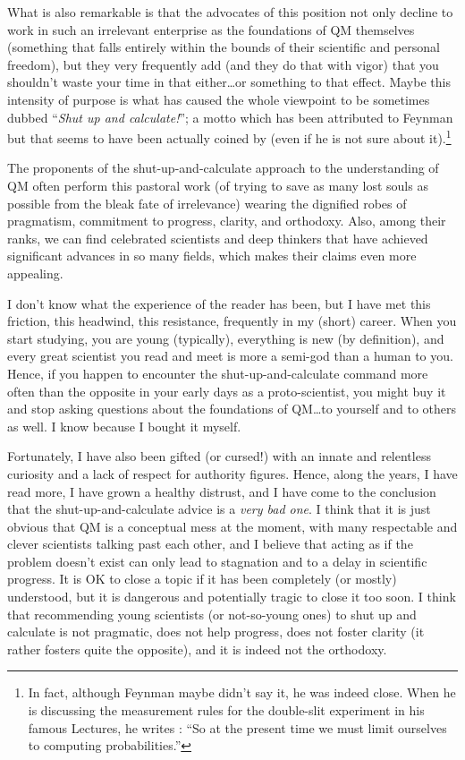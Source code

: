 \documentclass[12pt]{article}
\begin{document}
What is also remarkable is that the advocates of this position not only
decline to work in such an irrelevant enterprise as the foundations of QM
themselves (something that falls entirely within the bounds of their
scientific and personal freedom), but they very frequently add (and they do
that with vigor) that you shouldn't waste your time in that either\ldots or
something to that effect. Maybe this intensity of purpose is what has caused
the whole viewpoint to be sometimes dubbed ``\emph{Shut up and calculate!}'';
a motto which has been attributed to Feynman but that seems to have been
actually coined by \cite{Mermin2004} (even if he is not sure about
it).\footnote{\label{foot:Feynman_compute} In fact, although Feynman maybe
didn't say it, he was indeed close. When he is discussing the measurement
rules for the double-slit experiment in his famous Lectures, he writes
\citep[p.~10-1]{Feynman1963}: ``So at the present time we must limit ourselves
to computing probabilities.''}

The proponents of the shut-up-and-calculate approach to the understanding of
QM often perform this pastoral work (of trying to save as many lost souls as
possible from the bleak fate of irrelevance) wearing the dignified robes of
pragmatism, commitment to progress, clarity, and orthodoxy. Also, among their
ranks, we can find celebrated scientists and deep thinkers that have achieved
significant advances in so many fields, which makes their claims even more
appealing.

I don't know what the experience of the reader has been, but I have met this
friction, this headwind, this resistance, frequently in my (short) career.
When you start studying, you are young (typically), everything is new (by
definition), and every great scientist you read and meet is more a semi-god
than a human to you. Hence, if you happen to encounter the
shut-up-and-calculate command more often than the opposite in your early days
as a proto-scientist, you might buy it and stop asking questions about the
foundations of QM\ldots to yourself and to others as well. I know because I
bought it myself.

Fortunately, I have also been gifted (or cursed!) with an innate and
relentless curiosity and a lack of respect for authority figures. Hence, along
the years, I have read more, I have grown a healthy distrust, and I have come
to the conclusion that the shut-up-and-calculate advice is a \emph{very bad
one}. I think that it is just obvious that QM is a conceptual mess at the
moment, with many respectable and clever scientists talking past each other,
and I believe that acting as if the problem doesn't exist can only lead to
stagnation and to a delay in scientific progress. It is OK to close a topic if
it has been completely (or mostly) understood, but it is dangerous and
potentially tragic to close it too soon. I think that recommending young
scientists (or not-so-young ones) to shut up and calculate is not pragmatic,
does not help progress, does not foster clarity (it rather fosters quite the
opposite), and it is indeed not the orthodoxy.
\end{document}
